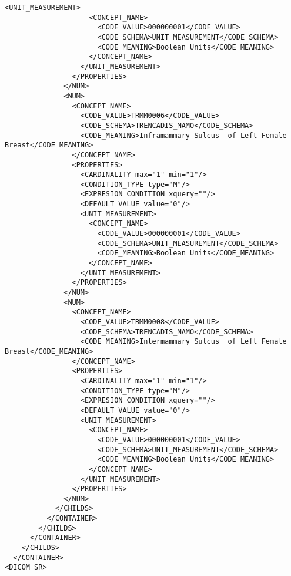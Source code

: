 \begin{lstlisting}[label=dicom-template,caption=Plantilla de un informe estructurado de una exploración de mama]
                  <UNIT_MEASUREMENT>
                    <CONCEPT_NAME>
                      <CODE_VALUE>000000001</CODE_VALUE>
                      <CODE_SCHEMA>UNIT_MEASUREMENT</CODE_SCHEMA>
                      <CODE_MEANING>Boolean Units</CODE_MEANING>
                    </CONCEPT_NAME>
                  </UNIT_MEASUREMENT>
                </PROPERTIES>
              </NUM>
              <NUM>
                <CONCEPT_NAME>
                  <CODE_VALUE>TRMM0006</CODE_VALUE>
                  <CODE_SCHEMA>TRENCADIS_MAMO</CODE_SCHEMA>
                  <CODE_MEANING>Inframammary Sulcus  of Left Female Breast</CODE_MEANING>
                </CONCEPT_NAME>
                <PROPERTIES>
                  <CARDINALITY max="1" min="1"/>
                  <CONDITION_TYPE type="M"/>
                  <EXPRESION_CONDITION xquery=""/>
                  <DEFAULT_VALUE value="0"/>
                  <UNIT_MEASUREMENT>
                    <CONCEPT_NAME>
                      <CODE_VALUE>000000001</CODE_VALUE>
                      <CODE_SCHEMA>UNIT_MEASUREMENT</CODE_SCHEMA>
                      <CODE_MEANING>Boolean Units</CODE_MEANING>
                    </CONCEPT_NAME>
                  </UNIT_MEASUREMENT>
                </PROPERTIES>
              </NUM>
              <NUM>
                <CONCEPT_NAME>
                  <CODE_VALUE>TRMM0008</CODE_VALUE>
                  <CODE_SCHEMA>TRENCADIS_MAMO</CODE_SCHEMA>
                  <CODE_MEANING>Intermammary Sulcus  of Left Female Breast</CODE_MEANING>
                </CONCEPT_NAME>
                <PROPERTIES>
                  <CARDINALITY max="1" min="1"/>
                  <CONDITION_TYPE type="M"/>
                  <EXPRESION_CONDITION xquery=""/>
                  <DEFAULT_VALUE value="0"/>
                  <UNIT_MEASUREMENT>
                    <CONCEPT_NAME>
                      <CODE_VALUE>000000001</CODE_VALUE>
                      <CODE_SCHEMA>UNIT_MEASUREMENT</CODE_SCHEMA>
                      <CODE_MEANING>Boolean Units</CODE_MEANING>
                    </CONCEPT_NAME>
                  </UNIT_MEASUREMENT>
                </PROPERTIES>
              </NUM>
            </CHILDS>
          </CONTAINER>
        </CHILDS>
      </CONTAINER>
    </CHILDS>
  </CONTAINER>
<DICOM_SR>

\end{lstlisting}

